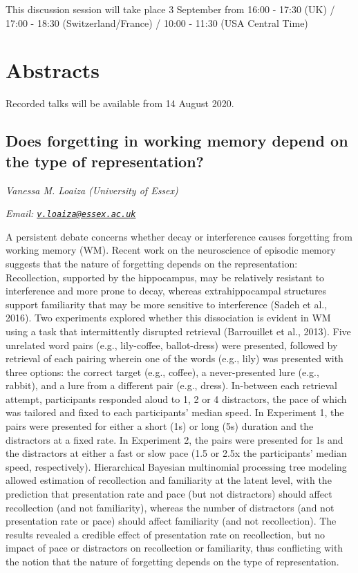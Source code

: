 \documentclass[12pt,]{book}
\begin{document}
This discussion session will take place 3 September from 16:00 - 17:30 (UK) / 17:00 - 18:30 (Switzerland/France) / 10:00 - 11:30 (USA Central Time)

\hypertarget{abstracts-5}{%
\section{Abstracts}\label{abstracts-5}}

Recorded talks will be available from 14 August 2020.

\hypertarget{does-forgetting-in-working-memory-depend-on-the-type-of-representation}{%
\subsection{Does forgetting in working memory depend on the type of representation?}\label{does-forgetting-in-working-memory-depend-on-the-type-of-representation}}

\emph{Vanessa M. Loaiza (University of Essex)}

\emph{Email: \href{mailto:v.loaiza@essex.ac.uk}{\nolinkurl{v.loaiza@essex.ac.uk}}}

A persistent debate concerns whether decay or interference causes forgetting from working memory (WM). Recent work on the neuroscience of episodic memory suggests that the nature of forgetting depends on the representation: Recollection, supported by the hippocampus, may be relatively resistant to interference and more prone to decay, whereas extrahippocampal structures support familiarity that may be more sensitive to interference (Sadeh et al., 2016). Two experiments explored whether this dissociation is evident in WM using a task that intermittently disrupted retrieval (Barrouillet et al., 2013). Five unrelated word pairs (e.g., lily-coffee, ballot-dress) were presented, followed by retrieval of each pairing wherein one of the words (e.g., lily) was presented with three options: the correct target (e.g., coffee), a never-presented lure (e.g., rabbit), and a lure from a different pair (e.g., dress). In-between each retrieval attempt, participants responded aloud to 1, 2 or 4 distractors, the pace of which was tailored and fixed to each participants' median speed. In Experiment 1, the pairs were presented for either a short (1s) or long (5s) duration and the distractors at a fixed rate. In Experiment 2, the pairs were presented for 1s and the distractors at either a fast or slow pace (1.5 or 2.5x the participants' median speed, respectively). Hierarchical Bayesian multinomial processing tree modeling allowed estimation of recollection and familiarity at the latent level, with the prediction that presentation rate and pace (but not distractors) should affect recollection (and not familiarity), whereas the number of distractors (and not presentation rate or pace) should affect familiarity (and not recollection). The results revealed a credible effect of presentation rate on recollection, but no impact of pace or distractors on recollection or familiarity, thus conflicting with the notion that the nature of forgetting depends on the type of representation.
\end{document}
